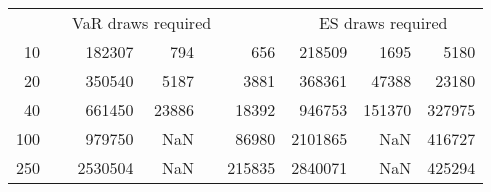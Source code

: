 {\begin{table}[h]
\begin{tabular}{rr rrr r rrr}
\hline 
 && \multicolumn{3}{c}{VaR draws required} &&   \multicolumn{3}{c}{ES draws required} \\  \cline{3-5}  \cline{7-9} 
10 & & 182307 & 794 & & 656 & 218509 & 1695 & 5180 \\ 
20 & & 350540 & 5187 & & 3881 & 368361 & 47388 & 23180 \\ 
40 & & 661450 & 23886 & & 18392 & 946753 & 151370 & 327975 \\ 
100 & & 979750 & NaN & & 86980 & 2101865 & NaN & 416727 \\ 
250 & & 2530504 & NaN & & 215835 & 2840071 & NaN & 425294 \\ 
\hline 
\end{tabular} 
\end{table} 
} 
